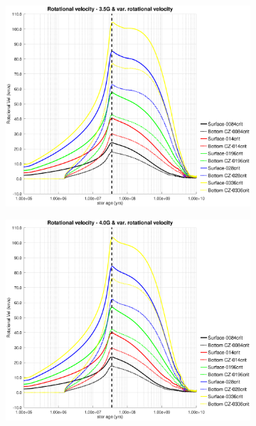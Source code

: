 \documentclass[fleqn,usenatbib]{mnras}
\begin{document}
\begin{figure}
    \begin{subfigure}[h]{0.47\textwidth}
    \includegraphics[trim = 30mm 15mm 20mm 15mm, clip,width=\textwidth]{figures/rot_vel_var_vel_3_5g.eps}
    \label{fig:subim43}
    \end{subfigure}
    \begin{subfigure}[h]{0.47\textwidth}
    \includegraphics[trim = 30mm 15mm 20mm 15mm, clip,width=\textwidth]{figures/rot_vel_var_vel_4_0g.eps}
    \label{fig:subim44}
    \end{subfigure}
    \begin{subfigure}[h]{0.47\textwidth}

\end{subfigure}
\end{figure}
\end{document}
